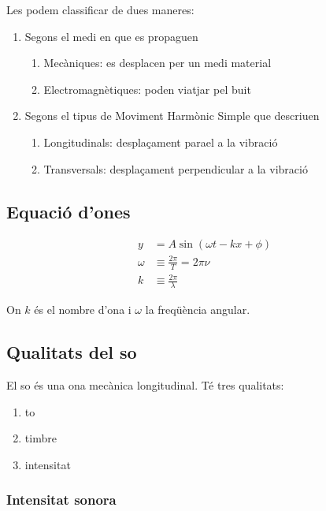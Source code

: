 Les podem classificar de dues maneres:
\begin{enumerate}
\item Segons el medi en que es propaguen
    \begin{enumerate}
        \item Mecàniques: es desplacen per un medi material
        \item Electromagnètiques: poden viatjar pel buit
    \end{enumerate}
\item Segons el tipus de Moviment Harmònic Simple que descriuen
    \begin{enumerate}
        \item Longitudinals: desplaçament para\lgem el a la vibració
        \item Transversals: desplaçament perpendicular a la vibració
    \end{enumerate}
\end{enumerate}

\subsection{Equació d'ones}
\label{sub:equacio_d_ones}

\begin{align}
    y &= A \sin \left( \omega t - k x + \phi \right)\\
    \omega &\equiv \frac{2\pi}{T} = 2\pi \nu \\
    k &\equiv \frac{2\pi}{\lambda}
\end{align}

On $k$ és el nombre d'ona i $\omega$ la freqüència angular.

\subsection{Qualitats del so}
\label{sub:qualitats_del_so}

El so és una ona mecànica longitudinal. Té tres qualitats:

\begin{enumerate}
    \item to
    \item timbre
    \item intensitat
\end{enumerate}


\subsubsection{Intensitat sonora}
\label{ssub:intensitat_sonora}

